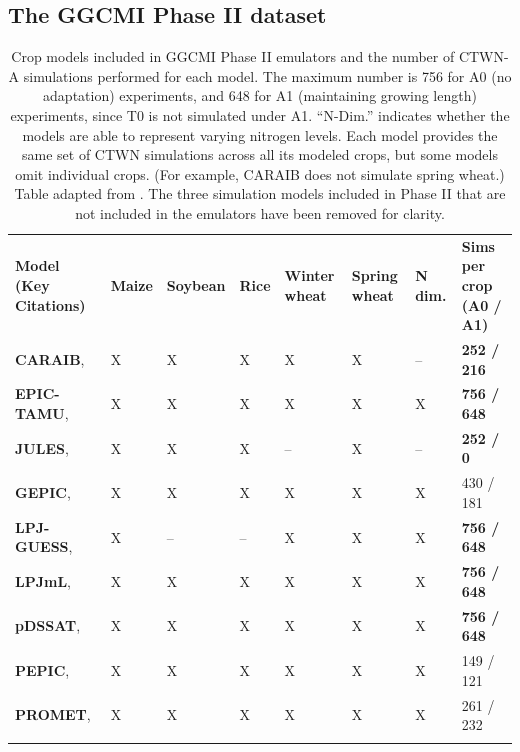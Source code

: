 \documentclass[gmd, manuscript]{copernicus} %
\begin{document}
\subsection{The GGCMI Phase II dataset}

\begin{table}[ht]
    \caption{
    Crop models included in GGCMI Phase II emulators and the number of CTWN-A simulations performed for each model. 
    The maximum number is 756 for A0 (no adaptation) experiments, and 648 for A1 (maintaining growing length) experiments, since T0 is not simulated under A1. ``N-Dim.'' indicates whether the models are able to represent varying nitrogen levels.
    Each model provides the same set of CTWN simulations across all its modeled crops, but some models omit individual crops. 
    (For example, CARAIB does not simulate spring wheat.)
    Table adapted from \citet{franke2019ctwnexperiment}. 
    The three simulation models included in Phase II that are not included in the emulators have been removed for clarity.
    }
    \label{table:models}
    \begin{tabular}{p{6cm} p{1cm} p{1cm} p{1cm} p{1cm} p{1cm} p{1cm} p{1.9cm}}
        \tophline
        \textbf{Model (Key Citations)} & \textbf{Maize} & \textbf{Soybean} & \textbf{Rice} & \textbf{Winter wheat} & \textbf{Spring wheat} & \textbf{N dim.} & \textbf{Sims per crop (A0 / A1)}\\ \middlehline
        \textbf{CARAIB},    \citet{Dury2011, Pirttioja2015}    & X & X & X & X & X & -- & \textbf{252 / 216} \\ \middlehline
        \textbf{EPIC-TAMU}, \citet{Izaurralde06}               & X & X & X & X & X & X & \textbf{756 / 648} \\ \middlehline
        \textbf{JULES},     \citet{Osborne2015, Williams2015, Williams2017} & X & X & X & -- & X & -- & \textbf{252 / 0}\\ \middlehline
        \textbf{GEPIC},     \citet{LIU2007478, FOLBERTH201221} & X & X & X & X & X & X & 430 / 181\\ \middlehline
        \textbf{LPJ-GUESS}, \citet{Lindeskog2013, Olin2015}    & X & -- & -- & X & X & X & \textbf{756 / 648}\\  \middlehline
        \textbf{LPJmL},     \citet{von_Bloh_implementing_2018} & X & X & X & X & X & X & \textbf{756 / 648}\\ \middlehline
        \textbf{pDSSAT},    \citet{Elliott2014b, JONES2003235} & X & X & X & X & X & X & \textbf{756 / 648}\\ \middlehline
        \textbf{PEPIC},     \citet{LIU2016164, LIU2016}        & X & X & X & X & X & X & 149 / 121\\ \middlehline
        \textbf{PROMET},    \citet{Hank2015, MAUSER2015}       & X & X & X & X & X & X & 261 / 232\\
        \bottomhline
    \end{tabular}
\end{table}
\end{document}
